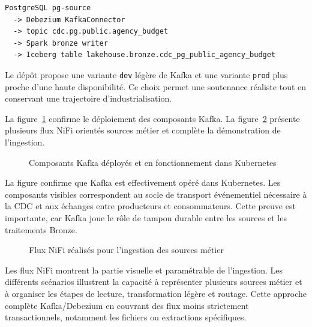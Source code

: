 \begin{lstlisting}[caption={Extrait conceptuel du flux CDC}]
PostgreSQL pg-source
  -> Debezium KafkaConnector
  -> topic cdc.pg.public.agency_budget
  -> Spark bronze writer
  -> Iceberg table lakehouse.bronze.cdc_pg_public_agency_budget
\end{lstlisting}

Le dépôt propose une variante \texttt{dev} légère de Kafka et une variante \texttt{prod} plus proche d'une haute disponibilité. Ce choix permet une soutenance réaliste tout en conservant une trajectoire d'industrialisation.

La figure~\ref{fig:realisation-kafka-running} confirme le déploiement des composants Kafka. La figure~\ref{fig:realisation-nifi-flux} présente plusieurs flux NiFi orientés sources métier et complète la démonstration de l'ingestion.

\begin{figure}[H]
\centering
{}
\caption{Composants Kafka déployés et en fonctionnement dans Kubernetes}
\label{fig:realisation-kafka-running}
\end{figure}

La figure confirme que Kafka est effectivement opéré dans Kubernetes. Les composants visibles correspondent au socle de transport événementiel nécessaire à la CDC et aux échanges entre producteurs et consommateurs. Cette preuve est importante, car Kafka joue le rôle de tampon durable entre les sources et les traitements Bronze.

\begin{figure}[H]
\centering
{}
\caption{Flux NiFi réalisés pour l'ingestion des sources métier}
\label{fig:realisation-nifi-flux}
\end{figure}

Les flux NiFi montrent la partie visuelle et paramétrable de l'ingestion. Les différents scénarios illustrent la capacité à représenter plusieurs sources métier et à organiser les étapes de lecture, transformation légère et routage. Cette approche complète Kafka/Debezium en couvrant des flux moins strictement transactionnels, notamment les fichiers ou extractions spécifiques.

